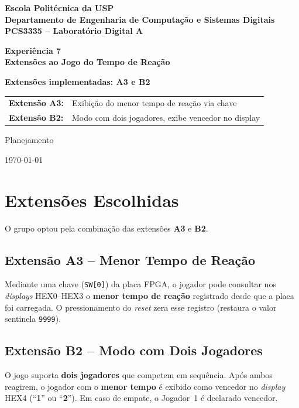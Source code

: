 \documentclass[12pt,a4paper]{article}
\begin{document}
\begin{titlepage}
  \centering
  \vspace*{2cm}
  {\Large\bfseries Escola Politécnica da USP\\
  Departamento de Engenharia de Computação e Sistemas Digitais\\[0.5em]
  PCS3335 -- Laboratório Digital A\par}
  \vspace{2cm}
  {\Huge\bfseries Experiência 7\\[0.4em]
  Extensões ao Jogo do Tempo de Reação\par}
  \vspace{1.5cm}
  {\large\bfseries Extensões implementadas: A3 e B2\par}
  \vspace{1cm}
  \begin{tabular}{ll}
    \textbf{Extensão A3:} & Exibição do menor tempo de reação via chave \\
    \textbf{Extensão B2:} & Modo com dois jogadores, exibe vencedor no display \\
  \end{tabular}
  \vspace{2.5cm}
  {\large Planejamento\par}
  \vspace{1cm}
  {\large \today\par}
\end{titlepage}

\tableofcontents
\newpage

\section{Extensões Escolhidas}

O grupo optou pela combinação das extensões \textbf{A3} e \textbf{B2}.

\subsection*{Extensão A3 -- Menor Tempo de Reação}
Mediante uma chave (\texttt{SW[0]}) da placa FPGA, o jogador pode consultar
nos \textit{displays} HEX0--HEX3 o \textbf{menor tempo de reação} registrado
desde que a placa foi carregada. O pressionamento do \textit{reset} zera esse
registro (restaura o valor sentinela \texttt{9999}).

\subsection*{Extensão B2 -- Modo com Dois Jogadores}
O jogo suporta \textbf{dois jogadores} que competem em sequência. Após ambos
reagirem, o jogador com o \textbf{menor tempo} é exibido como vencedor no
\textit{display} HEX4 (``\textbf{1}'' ou ``\textbf{2}''). Em caso de empate,
o Jogador~1 é declarado vencedor.
\end{document}
